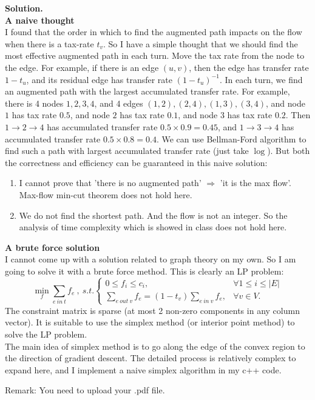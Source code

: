 \documentclass{article}
\begin{document}
\begin{enumerate}
\textbf{Solution.}\\
\textbf{A naive thought}\\
I found that the order in which to find the augmented path impacts on the flow when there is a tax-rate $t_v$. So I have a simple thought that we should find the most effective augmented path in each turn. Move the tax rate from the node to the edge. For example, if there is an edge $(u,v)$, then the edge has transfer rate $1-t_u$, and its residual edge has transfer rate $(1-t_u)^{-1}$. In each turn, we find an augmented path with the largest accumulated transfer rate. For example, there is 4 nodes $1,2,3,4$, and 4 edges $(1,2),(2,4),(1,3),(3,4)$, and node $1$ has tax rate $0.5$, and node $2$ has tax rate $0.1$, and node $3$ has tax rate $0.2$. Then $1\rightarrow2\rightarrow4$ has accumulated transfer rate $0.5\times0.9=0.45$, and $1\rightarrow3\rightarrow4$ has accumulated transfer rate $0.5\times0.8=0.4$. We can use Bellman-Ford algorithm to find such a path with largest accumulated transfer rate (just take $\log$). But both the correctness and efficiency can be guaranteed in this naive solution: \begin{enumerate}
    \item I cannot prove that 'there is no augmented path' $\Rightarrow$ 'it is the max flow'. Max-flow min-cut theorem does not hold here.
    \item We do not find the shortest path. And the flow is not an integer. So the analysis of time complexity which is showed in class does not hold here.
\end{enumerate}
\textbf{A brute force solution}\\
I cannot come up with a solution related to graph theory on my own. So I am going to solve it with a brute force method. This is clearly an LP problem: \\
$$\min_f \sum_{e\ in\ t} f_e\ ,\ s.t.\left\{\begin{array}{ll}0\leq f_i\leq c_i ,&\forall 1\leq i\leq |E|\\\sum_{e\ out\ v} f_e = (1-t_v) \sum_{e\ in\ v} f_e ,&\forall v\in V.\end{array}\right.$$
The constraint matrix is sparse (at most 2 non-zero components in any column vector). It is suitable to use the simplex method (or interior point method) to solve the LP problem.\\ The main idea of simplex method is to go along the edge of the convex region to the direction of gradient descent. The detailed process is relatively complex to expand here, and I implement a naive simplex algorithm in my c++ code.
\end{enumerate}
Remark: You need to upload your .pdf file.
\end{document}
